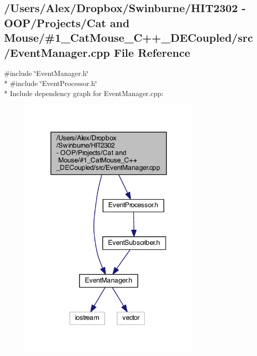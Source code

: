 \subsection{/\-Users/\-Alex/\-Dropbox/\-Swinburne/\-H\-I\-T2302 -\/ O\-O\-P/\-Projects/\-Cat and Mouse/\#1\-\_\-\-Cat\-Mouse\-\_\-\-C++\-\_\-\-D\-E\-Coupled/src/\-Event\-Manager.cpp File Reference}
\label{_event_manager_8cpp}
{\ttfamily \#include \char`\"{}Event\-Manager.\-h\char`\"{}}\\*
{\ttfamily \#include \char`\"{}Event\-Processor.\-h\char`\"{}}\\*
Include dependency graph for Event\-Manager.\-cpp\-:
\nopagebreak
\begin{figure}[H]
\begin{center}
\leavevmode
\includegraphics[width=252pt]{_event_manager_8cpp__incl}
\end{center}
\end{figure}
